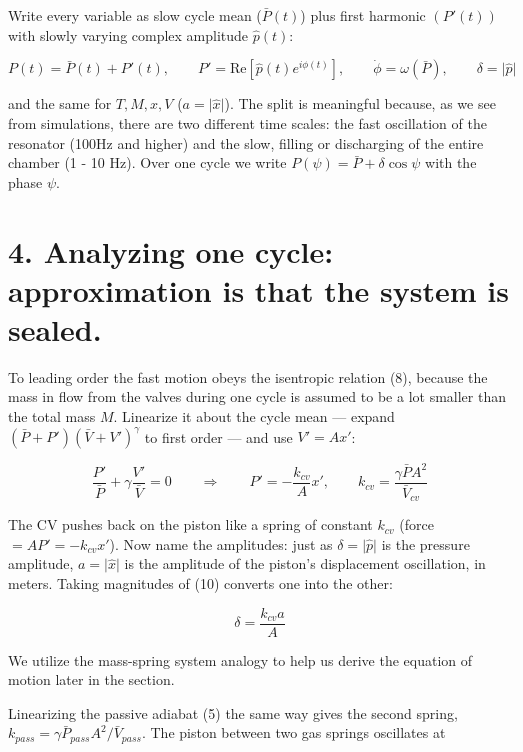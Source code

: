 \documentclass[11pt]{article}
\begin{document}
Write every variable as slow cycle mean ($\bar P(t)$) plus first harmonic $(P'(t))$ with slowly varying complex amplitude $\hat p(t)$:

\begin{equation}
P(t) = \bar P(t) + P'(t), \qquad P' = \mathrm{Re}\left[\hat p(t)e^{i\phi(t)}\right], \qquad \dot\phi = \omega(\bar P), \qquad \delta = \lvert\hat p\rvert \tag{9}
\end{equation}

and the same for $T, M, x, V$ ($a = \lvert\hat x\rvert$). The split is meaningful because, as we see from simulations, there are two different time scales: the fast oscillation of the resonator (100Hz and higher) and the slow, filling or discharging of the entire chamber (1 - 10 Hz). Over one cycle we write $P(\psi) = \bar P + \delta\cos\psi$ with the phase $\psi$.

\section*{4. Analyzing one cycle: approximation is that the system is sealed.}

To leading order the fast motion obeys the isentropic relation (8), because the mass in flow from the valves during one cycle is assumed to be a lot smaller than the total mass $M$. Linearize it about the cycle mean --- expand $(\bar P + P')(\bar V + V')^\gamma$ to first order --- and use $V' = Ax'$:

\begin{equation}
\frac{P'}{\bar P} + \gamma\frac{V'}{\bar V} = 0 \qquad\Longrightarrow\qquad P' = -\frac{k_{cv}}{A}x', \qquad k_{cv} = \frac{\gamma\bar PA^2}{\bar V_{cv}} \tag{10}
\end{equation}

The CV pushes back on the piston like a spring of constant $k_{cv}$ (force $= AP' = -k_{cv}x'$). Now name the amplitudes: just as $\delta = \lvert\hat p\rvert$ is the pressure amplitude, $a = \lvert\hat x\rvert$ is the amplitude of the piston's displacement oscillation, in meters. Taking magnitudes of (10) converts one into the other:

\begin{equation}
\delta = \frac{k_{cv}a}{A} \tag{11}
\end{equation}

We utilize the mass-spring system analogy to help us derive the equation of motion later in the section.

Linearizing the passive adiabat (5) the same way gives the second spring, $k_{pass} = \gamma\bar P_{pass}A^2/\bar V_{pass}$. The piston between two gas springs oscillates at
\end{document}
